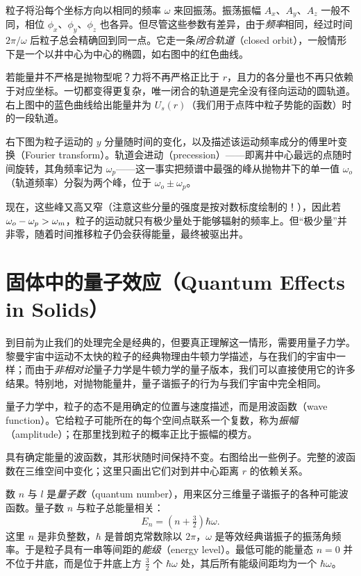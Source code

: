 
粒子将沿每个坐标方向以相同的频率 $\omega$ 来回振荡。振荡振幅 $A_{x}$、$A_{y}$、$A_{z}$ 一般不同，相位 $\phi_{x}$、$\phi_{y}$、$\phi_{z}$ 也各异。但尽管这些参数有差异，由于\emph{频率}相同，经过时间 $2\pi/\omega$ 后粒子总会精确回到同一点。它走一条\emph{闭合轨道}（closed orbit），一般情形下是一个以井中心为中心的椭圆，如右图中的红色曲线。

若能量井不严格是抛物型呢？力将不再严格正比于 $r$，且力的各分量也不再只依赖于对应坐标。一切都变得更复杂，唯一闭合的轨道是完全没有径向运动的圆轨道。右上图中的蓝色曲线给出能量井为 $U_{s}(r)$（我们用于点阵中粒子势能的函数）时的一段轨道。

右下图为粒子运动的 $y$ 分量随时间的变化，以及描述该运动频率成分的傅里叶变换（Fourier transform）。轨道会进动（precession）——即离井中心最远的点随时间旋转，其角频率记为 $\omega_{p}$——这一事实把频谱中最强的峰从抛物井下的单一值 $\omega_{o}$（轨道频率）分裂为两个峰，位于 $\omega_{o}\pm\omega_{p}$。

现在，这些峰又高又窄（注意这些分量的强度是按对数标度绘制的！），因此若 $\omega_{o}-\omega_{p}>\omega_m$，粒子的运动就只有极少量处于能够辐射的频率上。但“极少量”并非零，随着时间推移粒子仍会获得能量，最终被驱出井。

\section{固体中的量子效应（Quantum Effects in Solids）}

到目前为止我们的处理完全是经典的，但要真正理解这一情形，需要用量子力学。黎曼宇宙中运动不太快的粒子的经典物理由牛顿力学描述，与在我们的宇宙中一样；而由于\emph{非相对论}量子力学是牛顿力学的量子版本，我们可以直接使用它的许多结果。特别地，对抛物能量井，量子谐振子的行为与我们宇宙中完全相同。


量子力学中，粒子的态不是用确定的位置与速度描述，而是用波函数（wave function）。它给粒子可能所在的每个空间点联系一个复数，称为\emph{振幅}（amplitude）；在那里找到粒子的概率正比于振幅的模方。

具有确定能量的波函数，其形状随时间保持不变。右图给出一些例子。完整的波函数在三维空间中变化；这里只画出它们对到井中心距离 $r$ 的依赖关系。

数 $n$ 与 $l$ 是\emph{量子数}（quantum number），用来区分三维量子谐振子的各种可能波函数。量子数 $n$ 与粒子总能量相关：
\begin{equation}
E_{n}=\left(n+\tfrac{3}{2}\right)\hbar\omega .
\end{equation}
这里 $n$ 是非负整数，$\hbar$ 是普朗克常数除以 $2\pi$，$\omega$ 是等效经典谐振子的振荡角频率。于是粒子具有一串等间距的\emph{能级}（energy level）。最低可能的能量态 $n=0$ 并不位于井底，而是位于井底上方 $\tfrac{3}{2}$ 个 $\hbar\omega$ 处，其后所有能级间距均为一个 $\hbar\omega$。


